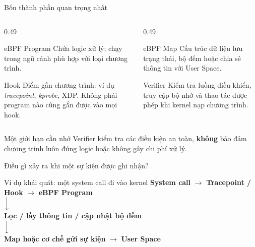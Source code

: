 \begin{frame}{Bốn thành phần quan trọng nhất}
  \begin{columns}[T,onlytextwidth]
    \begin{column}{0.49\textwidth}
      \begin{block}{eBPF Program}
        Chứa logic xử lý; chạy trong ngữ cảnh phù hợp với loại chương trình.
      \end{block}
      \begin{block}{Hook}
        Điểm gắn chương trình: ví dụ \textit{tracepoint}, \textit{kprobe}, XDP.
        Không phải program nào cũng gắn được vào mọi hook.
      \end{block}
    \end{column}
    \begin{column}{0.49\textwidth}
      \begin{block}{eBPF Map}
        Cấu trúc dữ liệu lưu trạng thái, bộ đếm hoặc chia sẻ thông tin
        với User Space.
      \end{block}
      \begin{block}{Verifier}
        Kiểm tra luồng điều khiển, truy cập bộ nhớ và thao tác được phép
        khi kernel nạp chương trình.
      \end{block}
    \end{column}
  \end{columns}
  \vspace{0.16cm}
  \begin{alertblock}{Một giới hạn cần nhớ}
    Verifier kiểm tra các điều kiện an toàn, \textbf{không} bảo đảm chương trình
    luôn đúng logic hoặc không gây chi phí xử lý.
  \end{alertblock}
\end{frame}

\begin{frame}{Điều gì xảy ra khi một sự kiện được ghi nhận?}
  \begin{block}{Ví dụ khái quát: một system call đi vào kernel}
    \centering
    \textbf{System call} $\longrightarrow$ \textbf{Tracepoint / Hook}
    $\longrightarrow$ \textbf{eBPF Program}\\[0.15cm]
    $\Big\downarrow$\\[0.12cm]
    \textbf{Lọc / lấy thông tin / cập nhật bộ đếm}\\[0.15cm]
    $\Big\downarrow$\\[0.12cm]
    \textbf{Map hoặc cơ chế gửi sự kiện} $\longrightarrow$ \textbf{User Space}
  \end{block}
  \vspace{0.2cm}
\end{frame}
